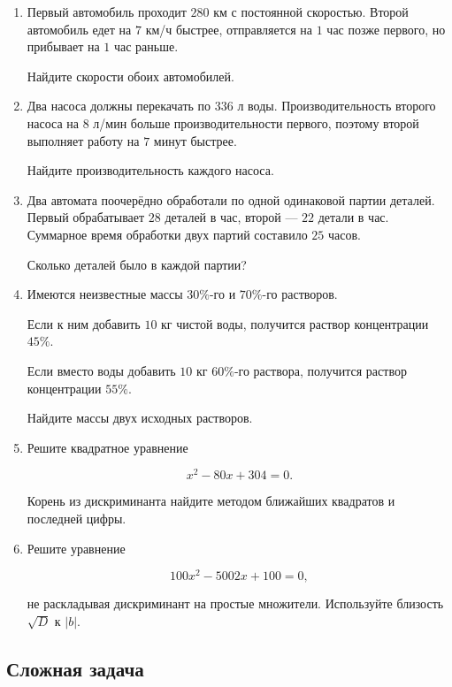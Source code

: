 \documentclass[a4paper,12pt]{article}
\begin{document}
\begin{enumerate}[label=\textbf{\arabic*.},resume]

\item
Первый автомобиль проходит \(280\) км с постоянной скоростью. Второй автомобиль едет на \(7\) км/ч быстрее, отправляется на \(1\) час позже первого, но прибывает на \(1\) час раньше.

Найдите скорости обоих автомобилей.

\item
Два насоса должны перекачать по \(336\) л воды. Производительность второго насоса на \(8\) л/мин больше производительности первого, поэтому второй выполняет работу на \(7\) минут быстрее.

Найдите производительность каждого насоса.

\item
Два автомата поочерёдно обработали по одной одинаковой партии деталей. Первый обрабатывает \(28\) деталей в час, второй --- \(22\) детали в час. Суммарное время обработки двух партий составило \(25\) часов.

Сколько деталей было в каждой партии?

\item
Имеются неизвестные массы \(30\%\)-го и \(70\%\)-го растворов.

Если к ним добавить \(10\) кг чистой воды, получится раствор концентрации \(45\%\).

Если вместо воды добавить \(10\) кг \(60\%\)-го раствора, получится раствор концентрации \(55\%\).

Найдите массы двух исходных растворов.

\item
Решите квадратное уравнение

\[
x^2-80x+304=0.
\]

Корень из дискриминанта найдите методом ближайших квадратов и последней цифры.

\item
Решите уравнение

\[
100x^2-5002x+100=0,
\]

не раскладывая дискриминант на простые множители. Используйте близость \(\sqrt D\) к \(|b|\).

\end{enumerate}

\subsection*{\color{darkaccent}Сложная задача}
\end{document}
